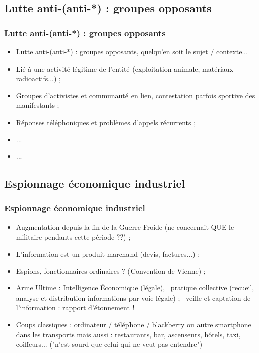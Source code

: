 \documentclass[slidetop,11pt]{beamer}
\begin{document}
\subsection{Lutte anti-(anti-*) : groupes opposants}
\begin{frame}
	\frametitle{Lutte anti-(anti-*) : groupes opposants}
	\begin{itemize}
		\item Lutte anti-(anti-*) : groupes opposants, quelqu'en soit le sujet / contexte...
		\item Li{\'e} {\`a} une activit{\'e} l{\'e}gitime de l'entit{\'e} (exploitation animale, mat{\'e}riaux radioactifs...) ; 
		\item Groupes d'activistes et communaut{\'e} en lien, contestation parfois sportive des manifestants ; 
		\item R{\'e}ponses t{\'e}l{\'e}phoniques et probl{\`e}mes d'appels r{\'e}currents ; 
		\item ...
		\item ...
	\end{itemize}
\end{frame}

\subsection{Espionnage {\'e}conomique industriel}
\begin{frame}
	\frametitle{Espionnage {\'e}conomique industriel}
	\begin{itemize}
		\item Augmentation depuis la fin de la Guerre Froide (ne concernait QUE le militaire pendants cette p{\'e}riode ??) ; 
		\item L'information est un produit marchand (devis, factures...) ; 
		\item Espions, fonctionnaires ordinaires ? (Convention de Vienne) ; 
		\item Arme Ultime : Intelligence {\'E}conomique (l{\'e}gale),~\newline
			pratique collective (recueil, analyse et distribution informations par voie l{\'e}gale) ;~\newline
			veille et captation de l'information : rapport d'{\'e}tonnement !
		\item Coups classiques : ordinateur / t{\'e}l{\'e}phone / blackberry ou autre smartphone dans les transports\newline
			mais aussi : restaurants, bar, ascenseurs, h{\^o}tels, taxi, coiffeurs... ("n'est sourd que celui qui ne veut pas entendre")
	\end{itemize}
\end{frame}
\end{document}
